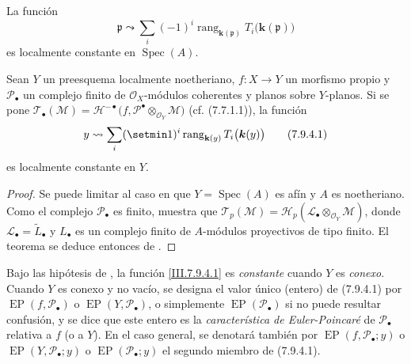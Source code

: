 \begin{corollary}[7.9.3]
\label{III.7.9.3}
\label{III.7.9.3.fr}
La función
\[
  \mathfrak p\leadsto
  \sum_i(-1)^i\operatorname{rang}_{\mathbf{k}(\mathfrak p)}
  T_i\bigl(\boldsymbol{k}(\mathfrak p)\bigr)
\]
es localmente constante en $\operatorname{Spec}(A)$.
\end{corollary}

\begin{theorem}[7.9.4]
\label{III.7.9.4}
\label{III.7.9.4.fr}
Sean $Y$ un preesquema localmente noetheriano,
$f:X\to Y$ un morfismo propio y $\mathscr P_\bullet$ un complejo
finito de $\mathscr O_X$-módulos coherentes y planos sobre $Y$-planos. Si se pone
$\mathscr T_\bullet(\mathscr M)
  =\mathscr H^{-\bullet}
  \bigl(f,\mathscr P^\bullet\otimes_{\mathscr O_Y}\mathscr M\bigr)$ \textup{(cf. (7.7.1.1))},
la función
\[
  y\leadsto
  \sum_i(\setmin 1)^i\operatorname{rang}_{\mathbf{k}(y)}
  T_i\bigl(\boldsymbol{k}(y)\bigr)
  \tag{7.9.4.1}\label{III.7.9.4.1.fr}
\]
es localmente constante en $Y$.
\end{theorem}

\begin{proof}
Se puede limitar al caso en que $Y=\operatorname{Spec}(A)$ es afín y $A$ es
noetheriano. Como el complejo $\mathscr P_\bullet$ es finito,
 muestra que
$\mathscr T_p(\mathscr M)=\mathscr H_p(\mathscr L_\bullet\otimes_{\mathscr O_Y}\mathscr M)$,
donde $\mathscr L_\bullet=\widetilde{L}_\bullet$ y
$L_\bullet$ es un complejo finito de $A$-módulos proyectivos de
tipo finito. El teorema se deduce entonces de
.
\end{proof}

\begin{env}[7.9.5]
\label{III.7.9.5}
\label{III.7.9.5.fr}
Bajo las hipótesis de , la función
\eqref{III.7.9.4.1} es \emph{constante} cuando $Y$ es
\emph{conexo}. Cuando $Y$ es conexo y no vacío, se designa
el valor único (entero) de (7.9.4.1) por $\operatorname{EP}(f,\mathscr P_\bullet)$ o $\operatorname{EP}(Y,\mathscr P_\bullet)$, o simplemente
$\operatorname{EP}(\mathscr P_\bullet)$
si no puede resultar confusión, y se dice que este entero es la
\emph{característica de Euler-Poincaré} de $\mathscr P_\bullet$
relativa a $f$ (o a $Y$). En el caso general, se denotará también por $\operatorname{EP}(f,\mathscr P_\bullet;y)$ o $\operatorname{EP}(Y,\mathscr P_\bullet;y)$ o
$\operatorname{EP}(\mathscr P_\bullet;y)$
el segundo miembro de (7.9.4.1).
\end{env}

